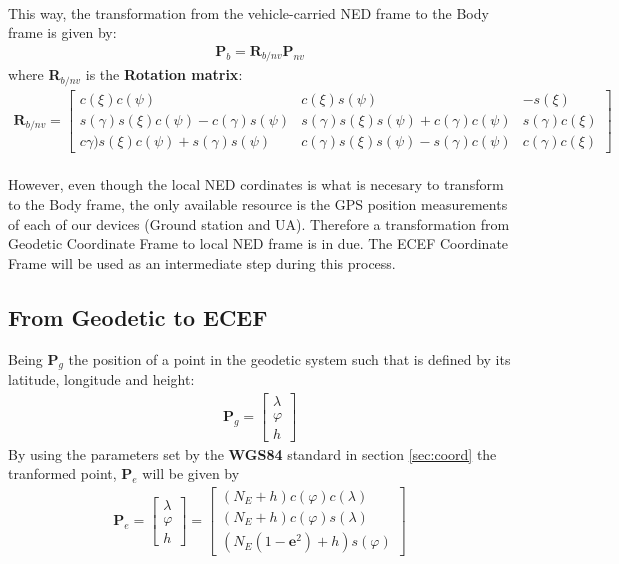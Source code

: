 \paragraph{} This way, the transformation from the vehicle-carried NED frame to the Body frame is given by:
\begin{align}
\textbf{P}_{b} = \textbf{R}_{b/nv}\textbf{P}_{nv}
\end{align}
where \textbf{R}$_{b/nv}$ is the \textbf{Rotation matrix}:
\begin{align*}
\textbf{R}_{b/nv} =
\begin{bmatrix}
c(\xi)c(\psi) & c(\xi)s(\psi) & -s(\xi)\\
s(\gamma)s(\xi)c(\psi) - c(\gamma)s(\psi) & s(\gamma)s(\xi)s(\psi) + c(\gamma)c(\psi) & s(\gamma)c(\xi)\\
c\gamma)s(\xi)c(\psi) + s(\gamma)s(\psi) & c(\gamma)s(\xi)s(\psi) - s(\gamma)c(\psi) & c(\gamma)c(\xi)
\end{bmatrix}
\end{align*}

\paragraph{} However, even though the local NED cordinates is what is necesary to transform to the Body frame, the only available resource  is the GPS position measurements of each of our devices (Ground station and UA). Therefore a transformation from Geodetic Coordinate Frame to local NED frame is in due. The ECEF Coordinate Frame will be used as an intermediate step during this process.

\subsection*{From Geodetic to ECEF}
Being \textbf{P}$_{g}$ the position of a point in the geodetic system such that is defined by its latitude, longitude and height:
\begin{align}
\textbf{P}_{g} = 
\begin{bmatrix}
\lambda \\
\varphi\\
h
\end{bmatrix}
\end{align}
By using the parameters set by the \textbf{WGS84} standard in section \ref{sec:coord} the tranformed point, \textbf{P}$_{e}$ will be given by
\begin{align}
\textbf{P}_{e} = 
\begin{bmatrix}
\lambda \\
\varphi\\
h
\end{bmatrix}
=
\begin{bmatrix}
(N_{E}+h)c(\varphi)c(\lambda) \\
(N_{E}+h)c(\varphi)s(\lambda) \\
(N_{E}(1-\textbf{e}^2)+h)s(\varphi)
\end{bmatrix}
\end{align}

